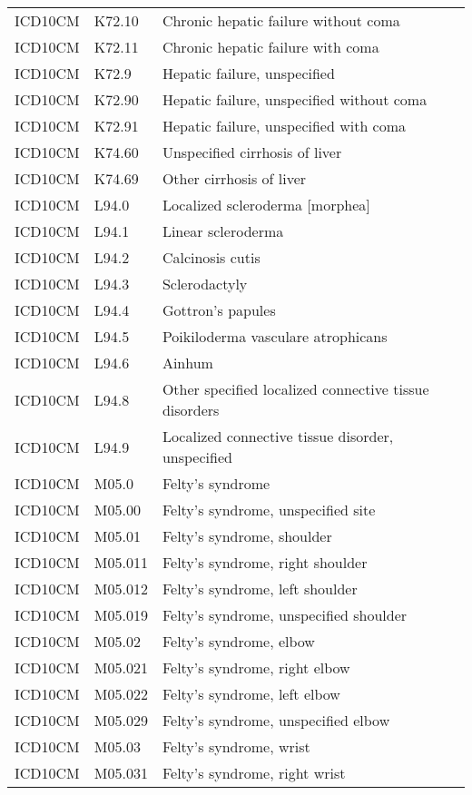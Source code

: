 \begin{table}[ht]
\begin{tabular}{lll}
  ICD10CM & K72.10 & Chronic hepatic failure without coma \\ 
  ICD10CM & K72.11 & Chronic hepatic failure with coma \\ 
  ICD10CM & K72.9 & Hepatic failure, unspecified \\ 
  ICD10CM & K72.90 & Hepatic failure, unspecified without coma \\ 
  ICD10CM & K72.91 & Hepatic failure, unspecified with coma \\ 
  ICD10CM & K74.60 & Unspecified cirrhosis of liver \\ 
  ICD10CM & K74.69 & Other cirrhosis of liver \\ 
  ICD10CM & L94.0 & Localized scleroderma [morphea] \\ 
  ICD10CM & L94.1 & Linear scleroderma \\ 
  ICD10CM & L94.2 & Calcinosis cutis \\ 
  ICD10CM & L94.3 & Sclerodactyly \\ 
  ICD10CM & L94.4 & Gottron's papules \\ 
  ICD10CM & L94.5 & Poikiloderma vasculare atrophicans \\ 
  ICD10CM & L94.6 & Ainhum \\ 
  ICD10CM & L94.8 & Other specified localized connective tissue disorders \\ 
  ICD10CM & L94.9 & Localized connective tissue disorder, unspecified \\ 
  ICD10CM & M05.0 & Felty's syndrome \\ 
  ICD10CM & M05.00 & Felty's syndrome, unspecified site \\ 
  ICD10CM & M05.01 & Felty's syndrome, shoulder \\ 
  ICD10CM & M05.011 & Felty's syndrome, right shoulder \\ 
  ICD10CM & M05.012 & Felty's syndrome, left shoulder \\ 
  ICD10CM & M05.019 & Felty's syndrome, unspecified shoulder \\ 
  ICD10CM & M05.02 & Felty's syndrome, elbow \\ 
  ICD10CM & M05.021 & Felty's syndrome, right elbow \\ 
  ICD10CM & M05.022 & Felty's syndrome, left elbow \\ 
  ICD10CM & M05.029 & Felty's syndrome, unspecified elbow \\ 
  ICD10CM & M05.03 & Felty's syndrome, wrist \\ 
  ICD10CM & M05.031 & Felty's syndrome, right wrist \\ 

\end{tabular}
\end{table}
